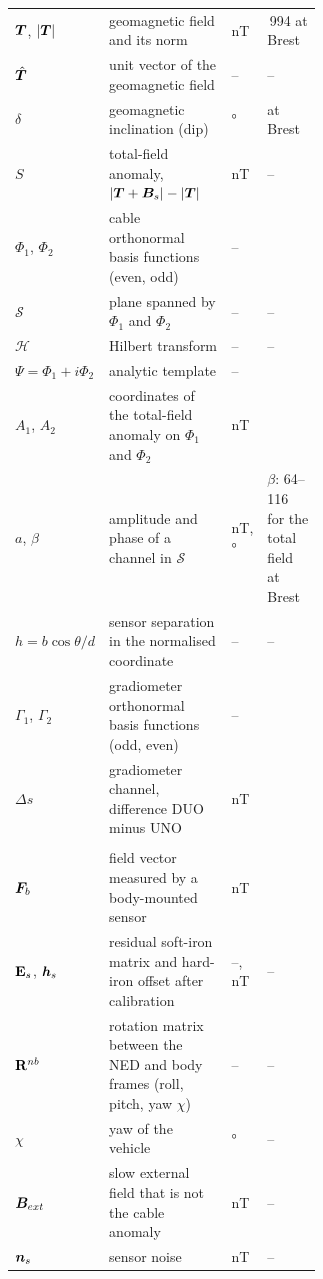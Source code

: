 \begin{longtable}{@{}l >{\raggedright\arraybackslash}p{0.42\linewidth} l >{\raggedright\arraybackslash}p{0.19\linewidth}@{}}
$\bm{T}$, $|\bm{T}|$ & geomagnetic field and its norm & \si{\nano\tesla} & 47\,994 at Brest \\
$\hat{\bm{T}}$ & unit vector of the geomagnetic field & -- & -- \\
$\delta$ & geomagnetic inclination (dip) & \si{\degree} & 63.7 at Brest \\
$S$ & total-field anomaly, $|\bm{T}+\bm{B}_s|-|\bm{T}|$ & \si{\nano\tesla} & -- \\
$\Phi_1$, $\Phi_2$ & cable orthonormal basis functions (even, odd) & -- & \todo{\eqref{eq:obf}} \\
$\mathcal{S}$ & plane spanned by $\Phi_1$ and $\Phi_2$ & -- & -- \\
$\mathcal{H}$ & Hilbert transform & -- & -- \\
$\Psi=\Phi_1+i\Phi_2$ & analytic template & -- & \todo{\eqref{eq:analytic}} \\
$A_1$, $A_2$ & coordinates of the total-field anomaly on $\Phi_1$ and $\Phi_2$ & \si{\nano\tesla} & \todo{\eqref{eq:total_field}} \\
$a$, $\beta$ & amplitude and phase of a channel in $\mathcal{S}$ & \si{\nano\tesla}, \si{\degree} & $\beta$: 64--116 for the total field at Brest \todo{\eqref{eq:channel}} \\
$h=b\cos\theta/d$ & sensor separation in the normalised coordinate & -- & -- \\
$\Gamma_1$, $\Gamma_2$ & gradiometer orthonormal basis functions (odd, even) & -- & \todo{\eqref{eq:grad_obf}} \\
$\Delta s$ & gradiometer channel, difference DUO minus UNO & \si{\nano\tesla} & \todo{\eqref{eq:grad_obf}} \\
\addlinespace
\multicolumn{4}{@{}l}{\textbf{Measurement model}} \\
$\bm{F}_b$ & field vector measured by a body-mounted sensor & \si{\nano\tesla} & \todo{\eqref{eq:recorded_field}} \\
$\mathbf{E}_s$, $\bm{h}_s$ & residual soft-iron matrix and hard-iron offset after calibration & --, \si{\nano\tesla} & -- \\
$\mathbf{R}^{nb}$ & rotation matrix between the NED and body frames (roll, pitch, yaw $\chi$) & -- & -- \\
$\chi$ & yaw of the vehicle & \si{\degree} & -- \\
$\bm{B}_{ext}$ & slow external field that is not the cable anomaly & \si{\nano\tesla} & -- \\
$\bm{n}_s$ & sensor noise & \si{\nano\tesla} & -- \\

\end{longtable}
